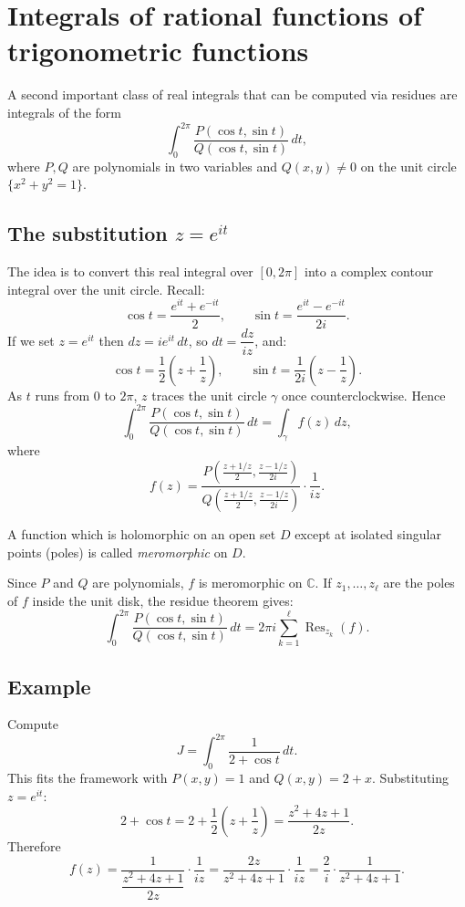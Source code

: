\section{Integrals of rational functions of trigonometric functions}

A second important class of real integrals that can be computed via residues are integrals of the form
\[
\int_0^{2\pi} \frac{P(\cos t,\sin t)}{Q(\cos t,\sin t)}\,dt,
\]
where $P,Q$ are polynomials in two variables and $Q(x,y)\neq 0$ on the unit circle $\{x^2+y^2=1\}$.

\subsection{The substitution \texorpdfstring{$z=e^{it}$}{z = exp(it)}}

The idea is to convert this real integral over $[0,2\pi]$ into a complex contour integral over the unit circle. Recall:
\[
\cos t = \frac{e^{it}+e^{-it}}{2}, \qquad \sin t = \frac{e^{it}-e^{-it}}{2i}.
\]
If we set $z=e^{it}$ then $dz=ie^{it}\,dt$, so $dt=\dfrac{dz}{iz}$, and:
\[
\cos t = \frac{1}{2}\left(z+\frac{1}{z}\right), \qquad
\sin t = \frac{1}{2i}\left(z-\frac{1}{z}\right).
\]
As $t$ runs from $0$ to $2\pi$, $z$ traces the unit circle $\gamma$ once counterclockwise. Hence
\[
\int_0^{2\pi} \frac{P(\cos t,\sin t)}{Q(\cos t,\sin t)}\,dt
=\int_\gamma f(z)\,dz,
\]
where
\[
f(z)=\frac{P\!\left(\tfrac{z+1/z}{2},\tfrac{z-1/z}{2i}\right)}{Q\!\left(\tfrac{z+1/z}{2},\tfrac{z-1/z}{2i}\right)}\cdot \frac{1}{iz}.
\]

\begin{definition}
A function which is holomorphic on an open set $D$ except at isolated singular points (poles) is called \emph{meromorphic} on $D$.
\end{definition}

Since $P$ and $Q$ are polynomials, $f$ is meromorphic on $\mathbb{C}$. If $z_1,\dots,z_\ell$ are the poles of $f$ inside the unit disk, the residue theorem gives:
\[
\int_0^{2\pi} \frac{P(\cos t,\sin t)}{Q(\cos t,\sin t)}\,dt
=2\pi i\sum_{k=1}^\ell \operatorname{Res}_{z_k}(f).
\]

\subsection{Example}

Compute
\[
J=\int_0^{2\pi} \frac{1}{2+\cos t}\,dt.
\]
This fits the framework with $P(x,y)=1$ and $Q(x,y)=2+x$. Substituting $z=e^{it}$:
\[
2+\cos t = 2 + \frac{1}{2}\left(z+\frac{1}{z}\right) = \frac{z^2+4z+1}{2z}.
\]
Therefore
\[
f(z)=\frac{1}{\dfrac{z^2+4z+1}{2z}}\cdot \frac{1}{iz}
=\frac{2z}{z^2+4z+1}\cdot \frac{1}{iz}
=\frac{2}{i}\cdot\frac{1}{z^2+4z+1}.
\]

